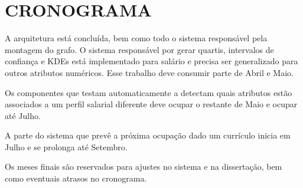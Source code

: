 \documentclass[12pt,a4paper,final]{article}
\begin{document}
\section{CRONOGRAMA}

A arquitetura está concluída, bem como todo o sistema responsável pela montagem do grafo. O sistema responsável por gerar quartis, intervalos de confiança e KDEs está implementado para salário e precisa ser generalizado para outros atributos numéricos. Esse trabalho deve consumir parte de Abril e Maio.

Os componentes que testam automaticamente a detectam quais atributos estão associados a um perfil salarial diferente deve ocupar o restante de Maio e ocupar até Julho.

A parte do sistema que prevê a próxima ocupação dado um currículo inicia em Julho e se prolonga até Setembro.

Os meses finais são reservados para ajustes no sistema e na dissertação, bem como eventuais atrasos no cronograma.
\end{document}
